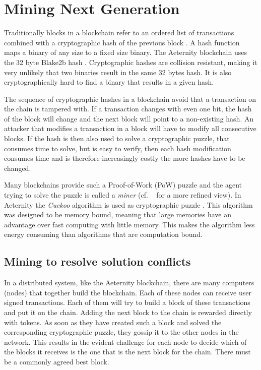 \section{Mining Next Generation}
\label{sect:mining}

Traditionally blocks in a blockchain refer to an ordered list of
transactions combined with a cryptographic hash of the previous block
\cite{whatisablockchain,raikwar2019sok}. A hash function maps a
binary of any size to a fixed size binary. The Aeternity blockchain
uses the 32 byte Blake2b hash \cite{aumasson2013blake2}. Cryptographic
hashes are collision resistant, making it very unlikely that two binaries
result in the same 32 bytes hash. It is also cryptographically hard
to find a binary that results in a given hash.

The sequence of cryptographic hashes in a blockchain avoid
that a transaction on the chain is tampered with. If a transaction
changes with even one bit, the hash of the block will change and the
next block will point to a non-existing hash. An attacker that
modifies a transaction in a block will have to modify all consecutive
blocks. If the hash is then also used to solve a cryptographic puzzle,
that consumes time to solve, but is easy to verify, then each hash
modification consumes time and is therefore increasingly costly the
more hashes have to be changed.

Many blockchains provide such a Proof-of-Work (PoW) puzzle and the agent
trying to solve the puzzle is called a \textit{miner} (cf. \ \cite{wang2018survey} for a more
refined view). In Aeternity the \textit{Cuckoo}
algorithm is used as cryptographic puzzle \cite{Tromp2015CuckooCA}. This
algorithm was designed to be memory bound, meaning that large memories
have an advantage over fast computing with little memory. This makes
the algorithm less energy consuming than algorithms that are
computation bound.

\subsection{Mining to resolve solution conflicts}

In a distributed system, like the Aeternity blockchain, there are many
computers (nodes) that together build the blockchain. Each of these nodes
can receive user signed transactions. Each of them will try to build a
block of these transactions and put it on the chain. Adding the next
block to the chain is rewarded directly with tokens. As soon as they
have created such a block and solved the corresponding cryptographic
puzzle, they gossip it to the other nodes in the network. This results
in the evident challenge for each node to decide  which of the blocks
it receives is the one that is the next block for the chain. There
must be a commonly agreed best block.

